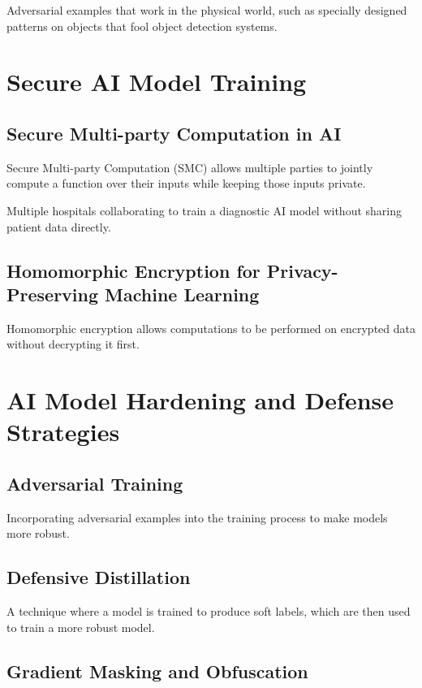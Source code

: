 \documentclass[
]{article}
\begin{document}
Adversarial examples that work in the physical world, such as specially
designed patterns on objects that fool object detection systems.

\section{Secure AI Model Training}

\subsection{Secure Multi-party Computation in AI}

Secure Multi-party Computation (SMC) allows multiple parties to jointly
compute a function over their inputs while keeping those inputs private.

\begin{example}
Multiple hospitals collaborating to train a diagnostic AI model without sharing patient data directly.
\end{example}

\subsection{Homomorphic Encryption for Privacy-Preserving Machine Learning}

Homomorphic encryption allows computations to be performed on encrypted
data without decrypting it first.

\section{AI Model Hardening and Defense Strategies}

\subsection{Adversarial Training}

Incorporating adversarial examples into the training process to make
models more robust.

\subsection{Defensive Distillation}

A technique where a model is trained to produce soft labels, which are
then used to train a more robust model.

\subsection{Gradient Masking and Obfuscation}
\end{document}
